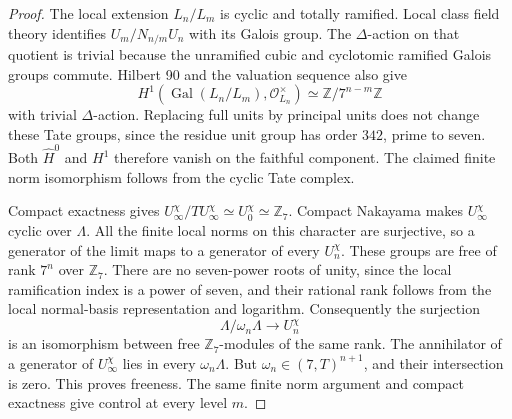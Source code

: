 \documentclass[11pt]{article}
\begin{document}
\begin{proof}
The local extension $L_n/L_m$ is cyclic and totally ramified.
Local class field theory identifies
$U_m/N_{n/m}U_n$ with its Galois group. The $\Delta$-action on that
quotient is trivial because the unramified cubic and cyclotomic
ramified Galois groups commute. Hilbert 90 and the valuation sequence
also give
\[
 H^1(\operatorname{Gal}(L_n/L_m),\mathcal O_{L_n}^\times)
 \simeq\mathbb Z/7^{n-m}\mathbb Z
\]
with trivial $\Delta$-action. Replacing full units by principal units
does not change these Tate groups, since the residue unit group has
order $342$, prime to seven. Both
$\widehat H^0$ and $H^1$ therefore vanish on the faithful component.
The claimed finite norm isomorphism follows from the cyclic Tate
complex.

Compact exactness gives
$U_\infty^\chi/TU_\infty^\chi\simeq U_0^\chi\simeq\mathbb Z_7$.
Compact Nakayama makes $U_\infty^\chi$ cyclic over $\Lambda$.
All the finite local norms on this character are surjective, so a
generator of the limit maps to a generator of every $U_n^\chi$.
These groups are free of rank $7^n$ over $\mathbb Z_7$. There are no
seven-power roots of unity, since the local ramification index is a
power of seven, and their rational rank follows from the local
normal-basis representation and logarithm. Consequently the
surjection
\[
 \Lambda/\omega_n\Lambda\longrightarrow U_n^\chi
\]
is an isomorphism between free $\mathbb Z_7$-modules of the same rank.
The annihilator of a generator of $U_\infty^\chi$ lies in every
$\omega_n\Lambda$. But $\omega_n\in(7,T)^{n+1}$, and their intersection
is zero. This proves freeness. The same finite norm argument and
compact exactness give control at every level $m$.
\end{proof}
\end{document}
